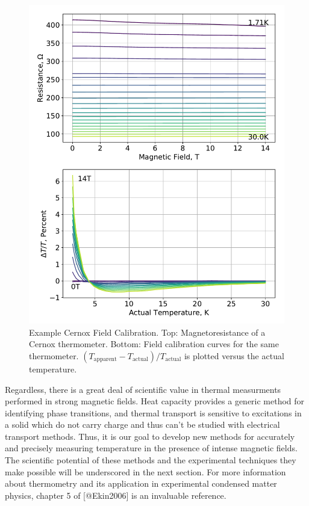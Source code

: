 \documentclass[12pt,]{article}
\begin{document}
\begin{figure}
\centering
\includegraphics{figures/cal_cernox_1.pdf}
\caption{Example Cernox Field Calibration. Top: Magnetoresistance of a
Cernox thermometer. Bottom: Field calibration curves for the same
thermometer.
\((T_{\mathrm{apparent}} - T_{\mathrm{actual}})/T_{\mathrm{actual}}\) is
plotted versus the actual temperature. \label{cernox_fieldcal}}
\end{figure}

Regardless, there is a great deal of scientific value in thermal
measurments performed in strong magnetic fields. Heat capacity provides
a generic method for identifying phase transitions, and thermal
transport is sensitive to excitations in a solid which do not carry
charge and thus can't be studied with electrical transport methods.
Thus, it is our goal to develop new methods for accurately and precisely
measuring temperature in the presence of intense magnetic fields. The
scientific potential of these methods and the experimental techniques
they make possible will be underscored in the next section. For more
information about thermometry and its application in experimental
condensed matter physics, chapter 5 of {[}@Ekin2006{]} is an invaluable
reference.
\end{document}
